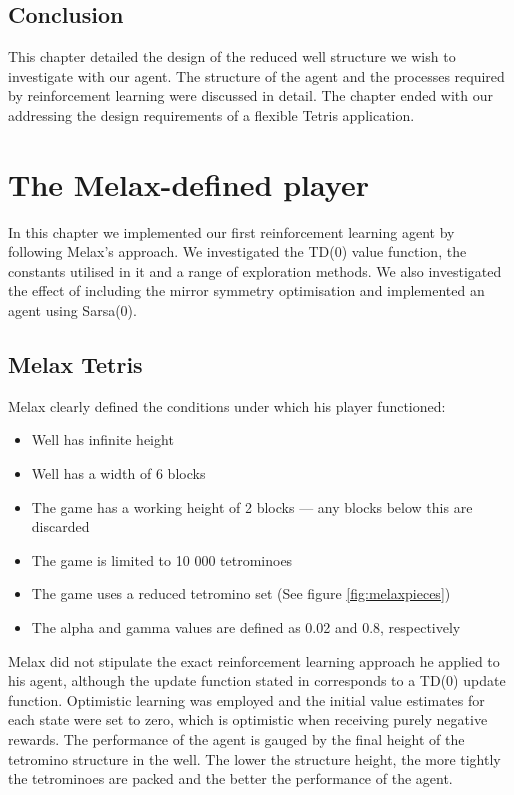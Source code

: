 \documentclass{rucsthesis}
\begin{document}
\section{Conclusion}

This chapter detailed the design of the reduced well structure we wish to investigate with our agent. The structure of the agent and the processes required by reinforcement learning were discussed in detail. The chapter ended with our addressing the design requirements of a flexible Tetris application. 

\chapter{The Melax-defined player}

In this chapter we implemented our first reinforcement learning agent by following Melax's approach. We investigated the TD(0) value function, the constants utilised in it and a range of exploration methods. We also investigated the effect of including the mirror symmetry optimisation and implemented an agent using Sarsa(0).

\section{Melax Tetris \label{melaxchapt}}

Melax clearly defined the conditions under which his player functioned:

\begin{itemize}
\item{Well has infinite height}
\item{Well has a width of 6 blocks}
\item{The game has a working height of 2 blocks --- any blocks below this are discarded}
\item{The game is limited to 10 000 tetrominoes}
\item{The game uses a reduced tetromino set (See figure \ref{fig:melaxpieces})}
\item{The alpha and gamma values are defined as 0.02 and 0.8, respectively}
\end{itemize}

Melax did not stipulate the exact reinforcement learning approach he applied to his agent, although the update function stated in \cite{melaxtetris} corresponds to a TD(0) update function. Optimistic learning was employed and the initial value estimates for each state were set to zero, which is optimistic when receiving purely negative rewards. The performance of the agent is gauged by the final height of the tetromino structure in the well. The lower the structure height, the more tightly the tetrominoes are packed and the better the performance of the agent.
\end{document}
